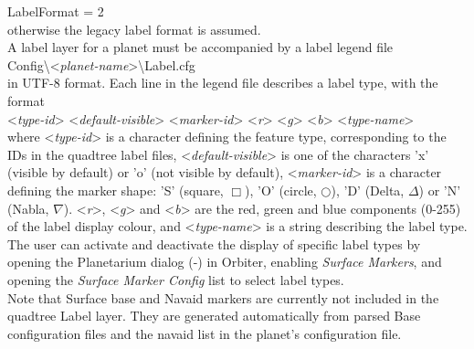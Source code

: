 \documentclass[Orbiter Developer Manual.tex]{subfiles}
\begin{document}
\indent LabelFormat = 2\\
otherwise the legacy label format is assumed.\\
A label layer for a planet must be accompanied by a label legend file\\
\indent Config\textbackslash <\textit{planet-name}>\textbackslash Label.cfg\\
in UTF-8 format. Each line in the legend file describes a label type, with the format\\
\indent <\textit{type-id}> <\textit{default-visible}> <\textit{marker-id}> <\textit{r}> <\textit{g}> <\textit{b}> <\textit{type-name}>\\
where <\textit{type-id}> is a character defining the feature type, corresponding to the IDs in the quadtree label files, <\textit{default-visible}> is one of the characters 'x' (visible by default) or 'o' (not visible by default), <\textit{marker-id}> is a character defining the marker shape: 'S' (square, $\Box$), 'O' (circle, $\bigcirc$), 'D' (Delta, $\Delta$) or 'N' (Nabla, $\nabla$). <\textit{r}>, <\textit{g}> and <\textit{b}> are the red, green and blue components (0-255) of the label display colour, and <\textit{type-name}> is a string describing the label type.\\
The user can activate and deactivate the display of specific label types by opening the Planetarium dialog (\Ctrl-) in Orbiter, enabling \textit{Surface Markers}, and opening the \textit{Surface Marker Config} list to select label types.\\
Note that Surface base and Navaid markers are currently not included in the quadtree Label layer. They are generated automatically from parsed Base configuration files and the navaid list in the planet's configuration file.
\end{document}
